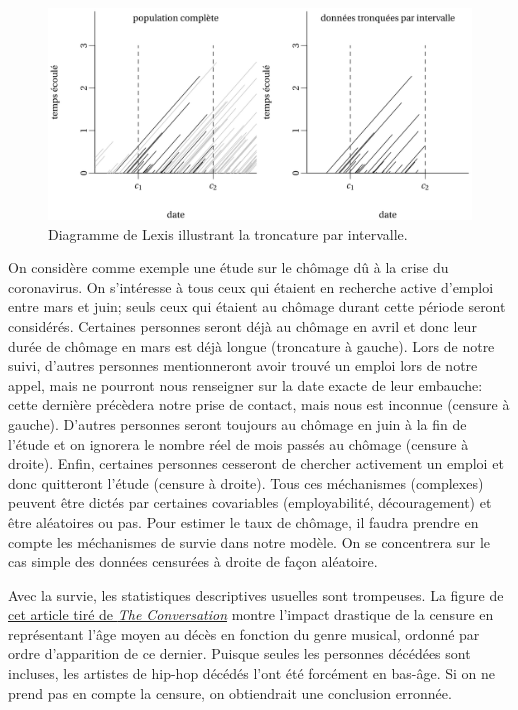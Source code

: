 \documentclass[
  11pt,
  letterpaper,
]{scrbook}
\theoremstyle{definition}
\theoremstyle{remark}
\begin{document}
\begin{figure}[ht!]

{\centering \includegraphics[width=1\textwidth,height=\textheight]{./figures/lexis_troncationintervalle.png}

}

\caption{\label{fig-troncatureintervalle}Diagramme de Lexis illustrant
la troncature par intervalle.}

\end{figure}

On considère comme exemple une étude sur le chômage dû à la crise du
coronavirus. On s'intéresse à tous ceux qui étaient en recherche active
d'emploi entre mars et juin; seuls ceux qui étaient au chômage durant
cette période seront considérés. Certaines personnes seront déjà au
chômage en avril et donc leur durée de chômage en mars est déjà longue
(troncature à gauche). Lors de notre suivi, d'autres personnes
mentionneront avoir trouvé un emploi lors de notre appel, mais ne
pourront nous renseigner sur la date exacte de leur embauche: cette
dernière précèdera notre prise de contact, mais nous est inconnue
(censure à gauche). D'autres personnes seront toujours au chômage en
juin à la fin de l'étude et on ignorera le nombre réel de mois passés au
chômage (censure à droite). Enfin, certaines personnes cesseront de
chercher activement un emploi et donc quitteront l'étude (censure à
droite). Tous ces méchanismes (complexes) peuvent être dictés par
certaines covariables (employabilité, découragement) et être aléatoires
ou pas. Pour estimer le taux de chômage, il faudra prendre en compte les
méchanismes de survie dans notre modèle. On se concentrera sur le cas
simple des données censurées à droite de façon aléatoire.

Avec la survie, les statistiques descriptives usuelles sont trompeuses.
La figure de
\href{https://theconversation.com/music-to-die-for-how-genre-affects-popular-musicians-life-expectancy-36660}{cet
article tiré de \emph{The Conversation}} montre l'impact drastique de la
censure en représentant l'âge moyen au décès en fonction du genre
musical, ordonné par ordre d'apparition de ce dernier. Puisque seules
les personnes décédées sont incluses, les artistes de hip-hop décédés
l'ont été forcément en bas-âge. Si on ne prend pas en compte la censure,
on obtiendrait une conclusion erronnée.
\end{document}
